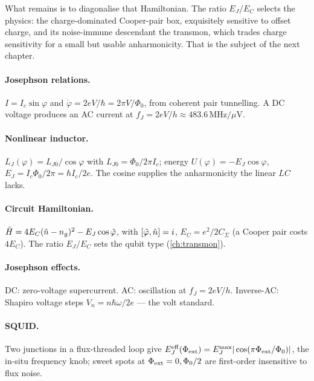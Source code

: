 What remains is to diagonalise that Hamiltonian. The ratio $E_J/E_C$
selects the physics: the charge-dominated Cooper-pair box, exquisitely
sensitive to offset charge, and its noise-immune descendant the
transmon, which trades charge sensitivity for a small but usable
anharmonicity. That is the subject of the next chapter.

\clearpage
\begin{chaptersummary}

\paragraph{Josephson relations.}
$I=I_c\sin\varphi$ and $\dot\varphi=2eV/\hbar=2\pi V/\Phi_0$, from
coherent pair tunnelling. A DC voltage produces an AC current at
$f_J=2eV/h\approx483.6\,$MHz$/\mu$V.

\paragraph{Nonlinear inductor.}
$L_J(\varphi)=L_{J0}/\cos\varphi$ with $L_{J0}=\Phi_0/2\pi I_c$;
energy $U(\varphi)=-E_J\cos\varphi$, $E_J=I_c\Phi_0/2\pi=\hbar I_c/2e$.
The cosine supplies the anharmonicity the linear $LC$ lacks.

\paragraph{Circuit Hamiltonian.}
$\hat{H}=4E_C(\hat{n}-n_g)^2-E_J\cos\hat{\varphi}$, with $\comm{\op\varphi}{\op n}=i$,
$E_C=e^2/2C_\Sigma$ (a Cooper pair costs $4E_C$). The ratio $E_J/E_C$
sets the qubit type (\cref{ch:transmon}).

\paragraph{Josephson effects.}
DC: zero-voltage supercurrent. AC: oscillation at $f_J=2eV/h$.
Inverse-AC: Shapiro voltage steps $V_n=n\hbar\omega/2e$ --- the volt
standard.

\paragraph{SQUID.}
Two junctions in a flux-threaded loop give
$E_J^{\rm eff}(\Phi_{\rm ext})=E_J^{\rm max}|\cos(\pi\Phi_{\rm ext}/\Phi_0)|$,
the in-situ frequency knob; sweet spots at $\Phi_{\rm ext}=0,\Phi_0/2$
are first-order insensitive to flux noise.

\end{chaptersummary}

